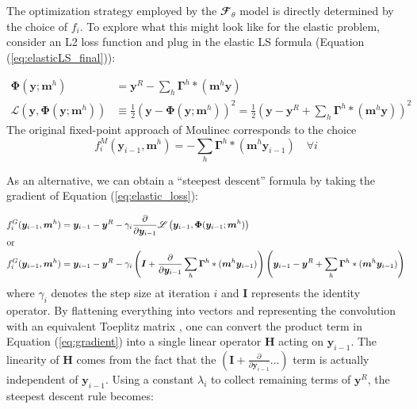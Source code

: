 \documentclass[3p, preprint]{elsarticle}
\newcommand{\bmgam}{\bm{\Gamma}}
\newcommand{\conv}{\ast}
\newcommand{\bmm}{\bm{m}}
\newcommand{\bmy}{\bm{y}}
\newcommand{\Phiop}{\bm{\Phi}}
\newcommand{\ident}{\bm{I}}
\newcommand{\Htoep}{\bm{H}}
\newcommand{\Loss}{\mathscr{L}}
\newcommand{\Ftheta}{\mathbfcal{F}_\theta}
\begin{document}
The optimization strategy employed by the $\Ftheta$ model is directly determined by the choice of $f_i$. To explore what this might look like for the elastic problem,  consider an L2 loss function and plug in the elastic LS formula (Equation (\ref{eq:elasticLS_final})):

\begin{align}
    \Phiop( \bmy; \bmm^h ) &= \bmy^R - \sum\limits_h \bmgam^h \conv \left( \bmm^h \bmy \right) \label{eq:elastic_LS_preloss}\\
    \Loss\left( \bmy, \Phiop( \bmy; \bmm^h ) \right) &\equiv \frac{1}{2} \left( \bmy - \Phiop( \bmy; \bmm^h ) \right)^2 = \frac{1}{2} \left (\bmy - \bmy^R + \sum\limits_h \bmgam^h \conv ( \bmm^h \bmy ) \right) ^2
    \label{eq:elastic_loss}
\end{align}
\noindent The original fixed-point approach of Moulinec \cite{moulinec1998} corresponds to the choice 
\begin{equation}
    f_i^{M}( \bmy_{i-1}, \bmm^h) = - \sum\limits_h \bmgam^h \conv \left( \bmm^h \bmy_{i-1} \right) \quad \forall i 
\end{equation}

\noindent As an alternative, we can obtain a ``steepest descent'' formula by taking the gradient \cite{Stein1952GradientMI} of Equation (\ref{eq:elastic_loss}):

\begin{align}
f_i^{G}(\bmy_{i-1}, \bmm^h) &= \bmy_{i-1} - \bmy^R - \gamma_i \frac{\partial} {\partial \bmy_{i-1}} \Loss \left( \bmy_{i-1}, \Phiop( \bmy_{i-1}; \bmm^h)  \right) \\
\intertext{or}
f_i^{G}(\bmy_{i-1}, \bmm^h) &= \bmy_{i-1} - \bmy^R - \gamma_i \left(\ident + \frac{\partial} {\partial \bmy_{i-1}}  \sum\limits_h \bmgam^h \conv ( \bmm^h \bmy_{i-1} ) \right) \left( \bmy_{i-1} - \bmy^R + \sum\limits_h \bmgam^h \conv ( \bmm^h \bmy_{i-1} ) \right)
 \label{eq:gradient}
\end{align}
\noindent where $\gamma_i$ denotes the step size at iteration $i$ and $\ident$ represents the identity operator. By flattening everything into vectors and representing the convolution with an equivalent Toeplitz matrix \cite{gray_toeplitz}, one can convert the product term in Equation (\ref{eq:gradient}) into a single linear operator $\Htoep$ acting on $\bmy_{i-1}$. The linearity of $\Htoep$ comes from the fact that the $(\ident + \frac{\partial} {\partial \bmy_{i-1}} \ldots)$ term is actually independent of $\bmy_{i-1}$. Using a constant $\lambda_i$ to collect remaining terms of $\bmy^R$, the steepest descent rule becomes:
\end{document}
